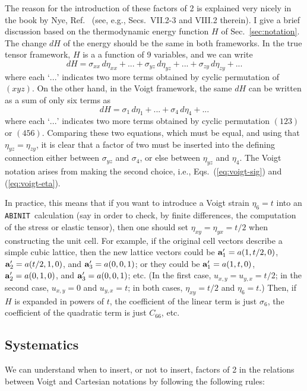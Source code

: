 \documentclass[11pt,fleqn]{article}
\def\beq{\begin{equation}}
\def\eeq{\end{equation}}
\def\ABINIT{{{\tt ABINIT}}}
\begin{document}
The reason for the introduction of these factors of 2 is explained
very nicely in the book by Nye, Ref.~\cite{nye}
(see, e.g., Secs.~VII.2-3 and VIII.2 therein).  I give a brief
discussion based on the thermodynamic energy function
$H$ of Sec.~\ref{sec:notation}.  The change $dH$ of the energy
should be the same in both frameworks.  In the true tensor
framework, $H$ is a a function of 9 variables, and we can write
%
\beq
dH= \sigma_{xx} \, d\eta_{xx} + ...
+ \sigma_{yz} \, d\eta_{yz} + ...
+ \sigma_{zy} \, d\eta_{zy} + ...
\eeq
%
where each `$...$' indicates two more terms obtained by cyclic
permutation of $(xyz)$.
On the other hand, in the Voigt framework, the same $dH$ can
be written as a sum of only six terms as
%
\beq
dH= \sigma_1 \, d\eta_1 + ...
+ \sigma_4 \, d\eta_4 + ...
\eeq
%
where each `$...$' indicates two more terms obtained by cyclic
permutation $(123)$ or $(456)$.
Comparing these two equations, which must be equal, and using that
$\eta_{yz}=\eta_{zy}$, it is clear that a factor of two must be inserted
into the defining connection either between $\sigma_{yz}$ and $\sigma_4$,
or else between $\eta_{yz}$ and $\eta_4$.  The Voigt notation arises
from making the second choice, i.e., Eqs.~(\ref{eq:voigt-sig}) and
(\ref{eq:voigt-eta}).

In practice, this means that if you want to introduce a Voigt strain
$\eta_6=t$ into an \ABINIT\ calculation (say in order to check, by
finite differences, the computation of the stress or elastic tensor),
then one should set $\eta_{xy}=\eta_{yx}=t/2$ when constructing the
unit cell.  For example, if the original cell vectors describe
a simple cubic lattice, then the new lattice vectors could be
${\bf a}_1'=a(1,t/2,0)$,
${\bf a}_2'=a(t/2,1,0)$,
and ${\bf a}_3'=a(0,0,1)$;
or they could be
${\bf a}_1'=a(1,t,0)$,
${\bf a}_2'=a(0,1,0)$,
and ${\bf a}_3'=a(0,0,1)$; etc.
(In the first case, $u_{x,y}=u_{y,x}=t/2$;
in the second case, $u_{x,y}=0$ and $u_{y,x}=t$; in both cases,
$\eta_{xy}=t/2$ and $\eta_6=t$.)
Then, if $H$ is expanded in powers of $t$, the coefficient of the
linear term is just $\sigma_6$, the coefficient of the
quadratic term is just $C_{66}$, etc.

\subsection{Systematics}

We can understand when to insert, or not to insert, factors of 2
in the relations between Voigt and Cartesian notations by following
the following rules:
\end{document}
